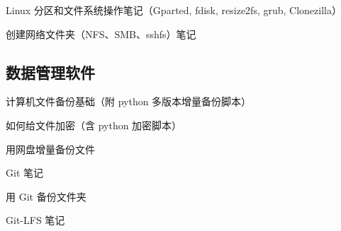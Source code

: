 Linux 分区和文件系统操作笔记（Gparted, fdisk, resize2fs, grub, Clonezilla）

创建网络文件夹（NFS、SMB、sshfs）笔记


\subsection{数据管理软件}
计算机文件备份基础（附 python 多版本增量备份脚本）

如何给文件加密（含 python 加密脚本）

用网盘增量备份文件

Git 笔记

用 Git 备份文件夹

Git-LFS 笔记
